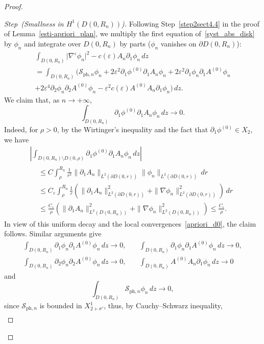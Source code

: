 \documentclass[10pt]{amsart}
\theoremstyle{definition}\newtheorem{defi}[theo]{Definition}\newtheorem{rema}[theo]{Remark}\newtheorem{exam}[theo]{Example}\newtheorem{exem}[theo]{Example}\newtheorem{nota}[theo]{Notation}
\newcommand*\p{\partial}
\newcommand{\phl}{\mathrm{ph}}
\newcommand*\BS{\mathcal{S}}
\newcommand*\ii{\infty}
\newcommand*\ls{\leqslant }
\newcommand*\e{\varepsilon}
\newcommand*\s{\sigma}
\newcounter{stepcount}
\newenvironment{step}[1]{\refstepcounter{stepcount}\begin{proof}[{Step~\thestepcount}{\;(#1)}]}{\let\qed\relax\end{proof}}
\begin{document}
\begin{proof}
\begin{step}{{Smallness in $ H^1 (D(0, R_n))$}}
Following Step~\ref{step2sect4.4} in the proof of Lemma~\ref{esti-apriori_plan}, we multiply the first equation of~\eqref{syst_abs_disk} by $ \phi_n $ and integrate over $ D(0,R_n) $ by parts ($ \phi_n $ vanishes on $ \p D (0,R_n) $):
\begin{multline}\label{apriori_d1}
 \int_{D(0,R_n)} \lvert \nabla^{\e} \phi_n \rvert^2 - c(\e) A_n \p_1 \phi_n \, dz
\\  = \int_{D(0,R_n)} \Big(\BS_{{\phl},n} \phi_n + 2 \e^2 \p_1 \phi^{(0)} \p_1 A_n \phi_n + 2 \e^2 \p_1 \phi_n \p_1 A^{(0)} \phi_n
\\+ 2 \e^4 \p_2 \phi_n \p_2 A^{(0)} \phi_n - \e^2 c(\e) A^{(0)} A_n \p_1 \phi_n \Big)
\, dz.
\end{multline}
We claim that, as $ n \to +\ii $,
\[
\int_{D(0,R_n)} \p_1 \phi^{(0)} \p_1 A_n \phi_n \, dz \to 0.
\]
Indeed, for $ \rho > 0 $, by the Wirtinger's inequality and the fact that $ \p_1 \phi^{(0)} \in X_2 $, we have
\begin{multline*}
\left \lvert \int_{D(0,R_n) \setminus D(0, \rho) } \p_1 \phi^{(0)} \p_1 A_n \phi_n \, dz \right \rvert \\
\begin{aligned}
& \ls C \int_\rho^{R_n} \frac{1}{r^2} \| \p_1 A_n \|_{L^2\left(\p D(0,r)\right)} \| \phi_n \|_{L^2\left(\p D(0,r)\right)} \, d r
\\ & \ls C_\e \int_\rho^{R_n} \frac{1}{r} \left(\| \p_1 A_n \|_{L^2(\p D(0,r))}^2 + \| \nabla \phi_n \|_{L^2(\p D(0,r))}^2\right) \, d r
\\ & \ls
\frac{C_\e}{ \rho } \left(\| \p_1 A_n \|_{L^2(D(0,R_n))}^2 + \| \nabla \phi_n \|_{L^2(D(0,R_n))}^2\right)
\ls \frac{C_\e}{ \rho }.
\end{aligned}
\end{multline*}
In view of this uniform decay and the local convergences~\eqref{apriori_d0}, the claim follows. Similar arguments give
\begin{align*}
\int_{D(0,R_n)} \p_1 \phi_n \p_1 A^{(0)} \phi_n \, dz \to 0,
\quad
&\int_{D(0,R_n)} \p_1 \phi_n \p_1 A^{(0)} \phi_n \, dz \to 0,
\\
\int_{D(0,R_n)} \p_2 \phi_n \p_2 A^{(0)} \phi_n \, dz \to 0,
\quad
&\int_{D(0,R_n)} A^{(0)} A_n \p_1 \phi_n \, dz \to 0
\end{align*}
and
\[
\int_{D(0,R_n)} \BS_{{\phl},n} \phi_n \, dz \to 0,
\]
since $ \BS_{{\phl},n} $ is bounded in $ X^1_{2+\s'} $, thus, by Cauchy--Schwarz inequality,
\begin{align*}

\end{align*}
\end{step}
\end{proof}
\end{document}
